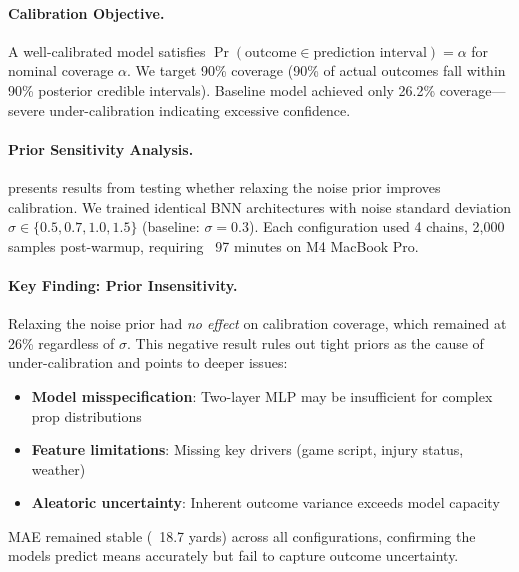 \paragraph{Calibration Objective.}
A well-calibrated model satisfies $\Pr(\text{outcome} \in \text{prediction interval}) = \alpha$ for nominal coverage $\alpha$. We target 90\% coverage (90\% of actual outcomes fall within 90\% posterior credible intervals). Baseline model achieved only 26.2\% coverage—severe under-calibration indicating excessive confidence.

\paragraph{Prior Sensitivity Analysis.}
 presents results from testing whether relaxing the noise prior improves calibration. We trained identical BNN architectures with noise standard deviation $\sigma \in \{0.5, 0.7, 1.0, 1.5\}$ (baseline: $\sigma=0.3$). Each configuration used 4 chains, 2,000 samples post-warmup, requiring ~97 minutes on M4 MacBook Pro.

\begin{table}[htbp]
\centering
\caption{BNN Prior Sensitivity Analysis: Calibration vs Noise Standard Deviation}
\label{tab:bnn-prior-sensitivity}

\end{table}

\paragraph{Key Finding: Prior Insensitivity.}
Relaxing the noise prior had \emph{no effect} on calibration coverage, which remained at 26\% regardless of $\sigma$. This negative result rules out tight priors as the cause of under-calibration and points to deeper issues:
\begin{itemize}
  \item \textbf{Model misspecification}: Two-layer MLP may be insufficient for complex prop distributions
  \item \textbf{Feature limitations}: Missing key drivers (game script, injury status, weather)
  \item \textbf{Aleatoric uncertainty}: Inherent outcome variance exceeds model capacity
\end{itemize}

MAE remained stable (~18.7 yards) across all configurations, confirming the models predict means accurately but fail to capture outcome uncertainty.

